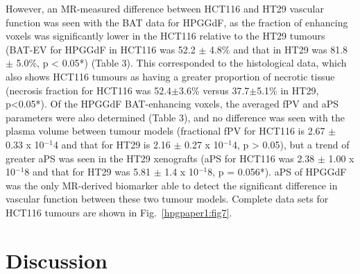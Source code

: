 However, an MR-measured difference between HCT116 and HT29 vascular function was seen with the BAT data for HPGGdF, as the fraction of enhancing voxels was significantly lower in the HCT116 relative to the HT29 tumours (BAT-EV for HPGGdF in HCT116 was 52.2 $\pm$ 4.8\% and that in HT29 was 81.8 $\pm$ 5.0\%, p < 0.05*) (Table 3).
This corresponded to the histological data, which also shows HCT116 tumours as having a greater proportion of necrotic tissue (necrosis fraction for HCT116 was 52.4$\pm$3.6\% versus 37.7$\pm$5.1\% in HT29, p<0.05*).
Of the HPGGdF BAT-enhancing voxels, the averaged fPV and aPS parameters were also determined (Table 3), and no difference was seen with the plasma volume between tumour models (fractional fPV for HCT116 is 2.67 $\pm$ 0.33 x 10$^{-1}$4 and that for HT29 is 2.16 $\pm$ 0.27 x 10$^{-1}$4, p > 0.05), but a trend of greater aPS was seen in the HT29 xenografts (aPS for HCT116 was 2.38 $\pm$ 1.00 x 10$^{-1}$8 and that for HT29 was 5.81 $\pm$ 1.4 x 10$^{-1}$8, p = 0.056*).
aPS of HPGGdF was the only MR-derived biomarker able to detect the significant difference in vascular function between these two tumour models.
Complete data sets for HCT116 tumours are shown in Fig.~\ref{hpgpaper1:fig7}.

\section{Discussion}

